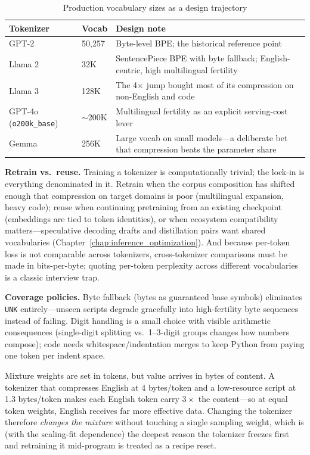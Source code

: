 \begin{table}[H]
\centering
\small
\caption{Production vocabulary sizes as a design trajectory}
\label{tab:pretrain_vocabs}
\begin{tabularx}{\textwidth}{llX}
\toprule
\textbf{Tokenizer} & \textbf{Vocab} & \textbf{Design note} \\
\midrule
GPT-2 & 50,257 & Byte-level BPE; the historical reference point \\
Llama 2 & 32K & SentencePiece BPE with byte fallback; English-centric, high multilingual fertility \\
Llama 3 & 128K & The 4$\times$ jump bought most of its compression on non-English and code \\
GPT-4o (\texttt{o200k\_base}) & $\sim$200K & Multilingual fertility as an explicit serving-cost lever \\
Gemma & 256K & Large vocab on small models---a deliberate bet that compression beats the parameter share \\
\bottomrule
\end{tabularx}
\end{table}

\textbf{Retrain vs.\ reuse.} Training a tokenizer is computationally trivial; the lock-in is everything denominated in it. Retrain when the corpus composition has shifted enough that compression on target domains is poor (multilingual expansion, heavy code); reuse when continuing pretraining from an existing checkpoint (embeddings are tied to token identities), or when ecosystem compatibility matters---speculative decoding drafts and distillation pairs want shared vocabularies (Chapter~\ref{chap:inference_optimization}). And because per-token loss is not comparable across tokenizers, cross-tokenizer comparisons must be made in bits-per-byte; quoting per-token perplexity across different vocabularies is a classic interview trap.

\textbf{Coverage policies.} Byte fallback (bytes as guaranteed base symbols) eliminates \texttt{UNK} entirely---unseen scripts degrade gracefully into high-fertility byte sequences instead of failing. Digit handling is a small choice with visible arithmetic consequences (single-digit splitting vs.\ 1--3-digit groups changes how numbers compose); code needs whitespace/indentation merges to keep Python from paying one token per indent space.

\begin{keyinsight}
Mixture weights are set in tokens, but value arrives in bytes of content. A tokenizer that compresses English at 4 bytes/token and a low-resource script at 1.3 bytes/token makes each English token carry $3\times$ the content---so at equal token weights, English receives far more effective data. Changing the tokenizer therefore \textit{changes the mixture} without touching a single sampling weight, which is (with the scaling-fit dependence) the deepest reason the tokenizer freezes first and retraining it mid-program is treated as a recipe reset.
\end{keyinsight}

